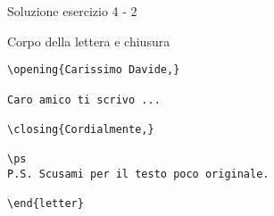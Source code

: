 \begin{frame}[fragile]{Soluzione esercizio 4 - 2}

Corpo della lettera e chiusura
\begin{lstlisting}
\opening{Carissimo Davide,}

Caro amico ti scrivo ...

\closing{Cordialmente,}

\ps
P.S. Scusami per il testo poco originale.

\end{letter}


\end{lstlisting}

\end{frame}